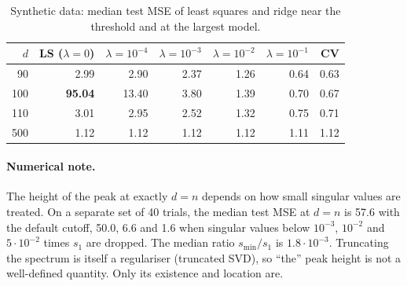 \documentclass[10pt,a4paper]{article}
\begin{document}
\begin{table}[t]
\centering\small
\begin{tabular}{rrrrrrr}
\toprule
$d$ & LS ($\lambda=0$) & $\lambda=10^{-4}$ & $\lambda=10^{-3}$ & $\lambda=10^{-2}$ & $\lambda=10^{-1}$ & CV \\
\midrule
 90 &  2.99 &  2.90 & 2.37 & 1.26 & 0.64 & 0.63 \\
100 & \textbf{95.04} & 13.40 & 3.80 & 1.39 & 0.70 & 0.67 \\
110 &  3.01 &  2.95 & 2.52 & 1.32 & 0.75 & 0.71 \\
500 &  1.12 &  1.12 & 1.12 & 1.12 & 1.11 & 1.12 \\
\bottomrule
\end{tabular}
\caption{Synthetic data: median test MSE of least squares and ridge near the threshold and at the largest model.}
\label{tab:ridge}
\end{table}

\paragraph{Numerical note.} The height of the peak at exactly $d=n$ depends on how small singular values are treated. On a separate set of 40 trials, the median test MSE at $d=n$ is 57.6 with the default cutoff, 50.0, 6.6 and 1.6 when singular values below $10^{-3}$, $10^{-2}$ and $5\cdot10^{-2}$ times $s_1$ are dropped. The median ratio $s_{\min}/s_1$ is $1.8\cdot10^{-3}$. Truncating the spectrum is itself a regulariser (truncated SVD), so ``the'' peak height is not a well-defined quantity. Only its existence and location are.
\end{document}
